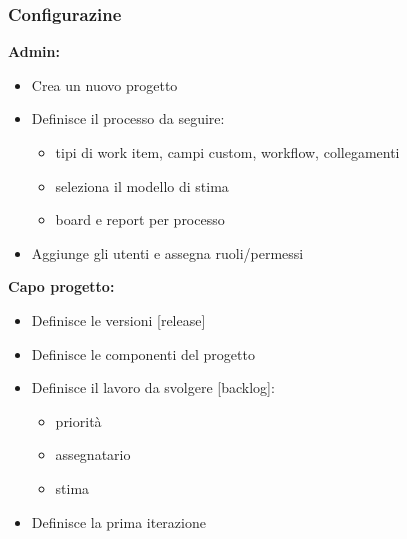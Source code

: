 \subsubsection{Configurazine}
\begin{multicols}{2}
    \raggedright
    \textbf{Admin:}
    \begin{itemize}
        \item Crea un nuovo progetto
        \item Definisce il processo da seguire:
        \begin{itemize}
            \item tipi di work item, campi custom, workflow, collegamenti
            \item seleziona il modello di stima
            \item board e report per processo
        \end{itemize}
        \item Aggiunge gli utenti e assegna ruoli/permessi
    \end{itemize}
    \columnbreak
    \textbf{Capo progetto:}
    \begin{itemize}
        \item Definisce le versioni [release]
        \item Definisce le componenti del progetto
        \item Definisce il lavoro da svolgere [backlog]:
        \begin{itemize}
            \item priorità
            \item assegnatario
            \item stima
        \end{itemize}
        \item Definisce la prima iterazione
    \end{itemize}
\end{multicols}

